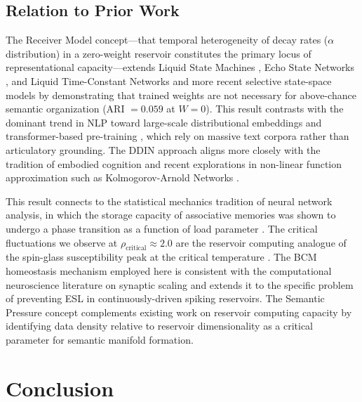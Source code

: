 \documentclass{article}
\begin{document}
\subsection{Relation to Prior Work}

The Receiver Model concept---that temporal heterogeneity of decay rates ($\alpha$
distribution) in a zero-weight reservoir constitutes the primary locus of
representational capacity---extends Liquid State Machines \citep{maass2002}, Echo State Networks \citep{jaeger2001echo,jaeger2004}, and Liquid Time-Constant Networks
\citep{hasani2021ltc} and more recent selective state-space models \citep{gu2022mamba} by demonstrating that trained weights are not necessary for
above-chance semantic organization (ARI $= 0.059$ at $W=0$). This result contrasts
with the dominant trend in NLP toward large-scale distributional embeddings
\citep{mikolov2013,pennington2014} and transformer-based pre-training
\citep{vaswani2017,devlin2019}, which rely on massive text corpora rather than
articulatory grounding. The DDIN approach aligns more closely with the tradition
of embodied cognition \citep{lakoff1999,varela1991} and recent explorations in
non-linear function approximation such as Kolmogorov-Arnold Networks \citep{liu2024kan}.

This result connects to the statistical mechanics tradition of neural network analysis, in which the storage
capacity of associative memories was shown to undergo a phase transition as a function
of load parameter \citep{gardner1988,mezard1987,sompolinsky1988}. The critical
fluctuations we observe at $\rho_{\text{critical}} \approx 2.0$ are the reservoir
computing analogue of the spin-glass susceptibility peak at the critical temperature
\citep{nishimori2010statistical,sethna2006cracks}. The BCM homeostasis mechanism
employed here is consistent with the computational neuroscience literature on synaptic
scaling \citep{turrigiano2004homeostatic} and extends it to the specific problem of
preventing ESL in continuously-driven spiking reservoirs. The Semantic Pressure concept
complements existing work on reservoir computing capacity \citep{jaeger2001echo,jaeger2004,sussillo2009} by
identifying data density relative to reservoir dimensionality as a critical parameter
for semantic manifold formation.

\section{Conclusion}
\end{document}
